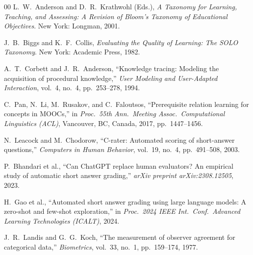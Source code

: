 \documentclass[conference]{IEEEtran}
\begin{document}
\begin{thebibliography}{00}
L.~W.~Anderson and D.~R.~Krathwohl (Eds.),
\textit{A Taxonomy for Learning, Teaching, and Assessing: A Revision of Bloom's
Taxonomy of Educational Objectives}.
New York: Longman, 2001.

J.~B.~Biggs and K.~F.~Collis,
\textit{Evaluating the Quality of Learning: The SOLO Taxonomy}.
New York: Academic Press, 1982.

A.~T.~Corbett and J.~R.~Anderson,
``Knowledge tracing: Modeling the acquisition of procedural knowledge,''
\textit{User Modeling and User-Adapted Interaction}, vol.~4, no.~4,
pp.~253--278, 1994.

C.~Pan, N.~Li, M.~Rusakov, and C.~Faloutsos,
``Prerequisite relation learning for concepts in MOOCs,''
in \textit{Proc.\ 55th Ann.\ Meeting Assoc.\ Computational Linguistics (ACL)},
Vancouver, BC, Canada, 2017, pp.~1447--1456.

N.~Leacock and M.~Chodorow,
``C-rater: Automated scoring of short-answer questions,''
\textit{Computers in Human Behavior}, vol.~19, no.~4,
pp.~491--508, 2003.

P.~Bhandari et al.,
``Can ChatGPT replace human evaluators? An empirical study of automatic
short answer grading,''
\textit{arXiv preprint arXiv:2308.12505}, 2023.

H.~Gao et al.,
``Automated short answer grading using large language models: A zero-shot
and few-shot exploration,''
in \textit{Proc.\ 2024 IEEE Int.\ Conf.\ Advanced Learning Technologies (ICALT)},
2024.

J.~R.~Landis and G.~G.~Koch,
``The measurement of observer agreement for categorical data,''
\textit{Biometrics}, vol.~33, no.~1, pp.~159--174, 1977.

\end{thebibliography}
\end{document}
